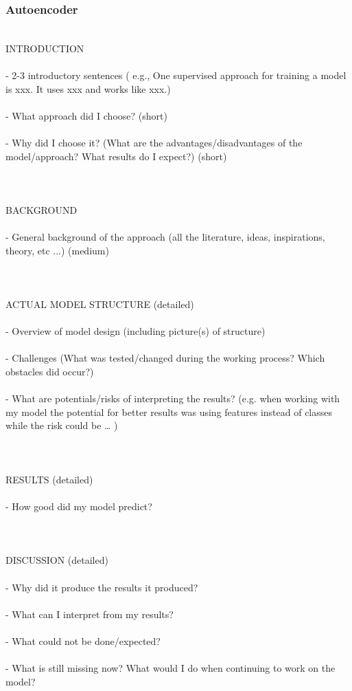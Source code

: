 \subsubsection{Autoencoder}
\\
INTRODUCTION \\
\\
- 2-3 introductory sentences ( e.g., One supervised approach for training a model is xxx. It uses xxx and works like xxx.) \\
\\
- What approach did I choose? (short) \\
\\
- Why did I choose it? (What are the advantages/disadvantages of the model/approach? What results do I expect?) (short) \\
\\
\\
\\
BACKGROUND \\
\\
- General background of the approach (all the literature, ideas, inspirations, theory, etc ...) (medium) \\
\\
\\
\\
ACTUAL MODEL STRUCTURE (detailed) \\
\\
- Overview of model design (including picture(s) of structure) \\
\\
- Challenges (What was tested/changed during the working process? Which obstacles did occur?) \\
\\
- What are potentials/risks of interpreting the results? (e.g. when working with my model the potential for better results was using features instead of classes while the risk could be … ) \\
\\
\\
\\
RESULTS (detailed) \\
\\
- How good did my model predict? \\
\\
\\
\\
DISCUSSION (detailed) \\
\\
- Why did it produce the results it produced? \\
\\
- What can I interpret from my results? \\
\\
- What could not be done/expected? \\
\\
- What is still missing now? What would I do when continuing to work on the model? \\
\\

